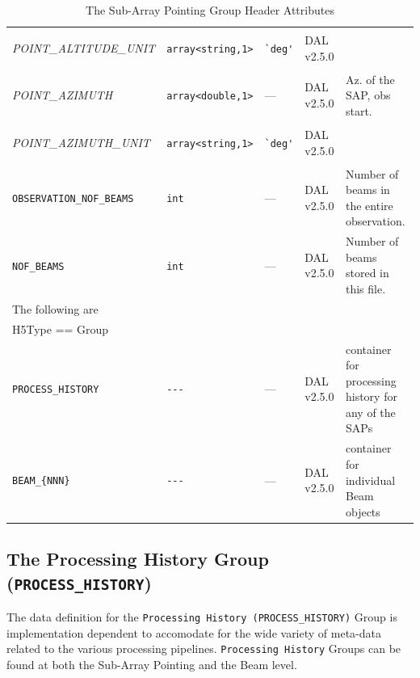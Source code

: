 \documentclass[a4paper,10pt,bibtotoc]{scrartcl}
\begin{document}
\begin{small}
\begin{table}[p]
\begin{small}
\begin{tabular}{|llllp{5.0cm}|}
    \begin{scriptsize}\textit{POINT\_ALTITUDE\_UNIT}\end{scriptsize} & \verb|array<string,1>| & \verb|`deg'| & DAL v2.5.0  & \\
    \begin{scriptsize}\textit{POINT\_AZIMUTH}\end{scriptsize} & \verb|array<double,1>| & --- & DAL v2.5.0 & Az. of the SAP, obs start.\\
    \begin{scriptsize}\textit{POINT\_AZIMUTH\_UNIT}\end{scriptsize} & \verb|array<string,1>| & \verb|`deg'| & DAL v2.5.0 & \\
    \verb|OBSERVATION_NOF_BEAMS|  & \verb|int| & --- & DAL v2.5.0 & Number of beams in the entire observation. \\
    \verb|NOF_BEAMS|  & \verb|int| & --- & DAL v2.5.0 & Number of beams stored in this file. \\
    \hline
    \sc The following are & \sc & \sc & \sc   &\\
    \sc H5Type == Group & \sc & \sc & \sc   &\\
    \hline 
    \verb|PROCESS_HISTORY| & \verb|---| & --- & DAL v2.5.0 &  container for processing
    history for any of the SAPs \\
    \verb|BEAM_{NNN}| & \verb|---| & --- & DAL v2.5.0 &  container for individual
    Beam objects \\
    \hline
  \end{tabular}
  \caption{The Sub-Array Pointing Group Header Attributes}
  \label{tab:sub-array pointing attributes}
\end{small}
\end{table}
\end{small}


\subsection{The Processing History Group ({\tt PROCESS\_HISTORY})}
\label{sec:processing history group}

The data definition for the \texttt{Processing History (PROCESS\_HISTORY)} Group is implementation dependent to accomodate for the wide variety of meta-data related to the various processing pipelines. \texttt{Processing History} Groups can be found at both the Sub-Array Pointing and the Beam level.
\end{document}
